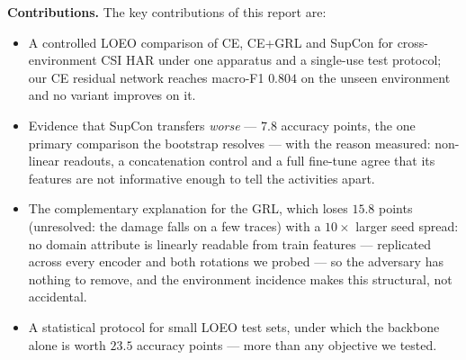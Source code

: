 \textbf{Contributions.} The key contributions of this report are:
\begin{itemize}
\item A controlled LOEO comparison of CE, CE+GRL and SupCon for
cross-environment CSI HAR under one apparatus and a single-use test protocol;
our CE residual network reaches macro-F1 $0.804$ on the unseen environment and
no variant improves on it.
\item Evidence that SupCon transfers \emph{worse} --- $7.8$ accuracy points,
the one primary comparison the bootstrap resolves --- with the reason
measured: non-linear readouts, a concatenation control and a full fine-tune
agree that its features are not informative enough to tell the activities
apart.
\item The complementary explanation for the GRL, which loses $15.8$ points
(unresolved: the damage falls on a few traces) with a $10\times$ larger seed
spread: no domain attribute is linearly readable
from train features --- replicated across every encoder and both rotations we
probed --- so
the adversary has nothing to remove, and the environment incidence
makes this structural, not accidental.
\item A statistical protocol for small LOEO test sets, under which the
backbone alone is worth $23.5$ accuracy points --- more than any objective we
tested.
\end{itemize}
